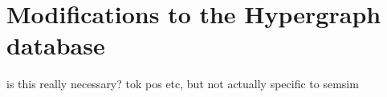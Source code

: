 \documentclass[11pt]{scrreprt}
\begin{document}
\section{Modifications to the Hypergraph database}
is this really necessary? tok pos etc, but not actually specific to semsim






%
%
%
%
%
%
%
\end{document}
